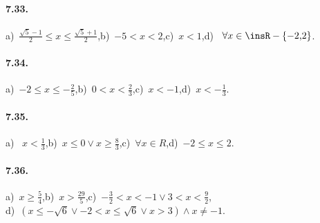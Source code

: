 \paragraph{7.33.} a)~$\frac{\sqrt 5-1} 2\le x\le \frac{\sqrt 5+1} 2$,\quad b)~$-5<x<2$,\quad c)~$x<1$,\quad d)~ $ \forall x \in \insR -\{-2\text{,}2\} $.

\paragraph{7.34.} a)~$-2\le x\le -\frac 2 5$,\quad b)~$0<x<\frac 2 3$,\quad c)~$x<-1$,\quad d)~$x<-\frac 1 3$.

\paragraph{7.35.} a)~ $x<\frac 1 3$,\quad b)~$x\le 0\vee x\ge \frac 8 3$,\quad c)~$\forall x\in R$,\quad d)~$-2\le x\le 2$.

\paragraph{7.36.} a)~$x\ge \frac 5 4$,\quad b)~$x>\frac{29} 5$,\quad c)~$-\frac 3 2<x<-1\vee 3<x<\frac 9 2$,\protect\\
\quad d)~$(x\le -\sqrt 6\vee -2<x\le \sqrt 6\vee x>3)\wedge x\neq -1$.
